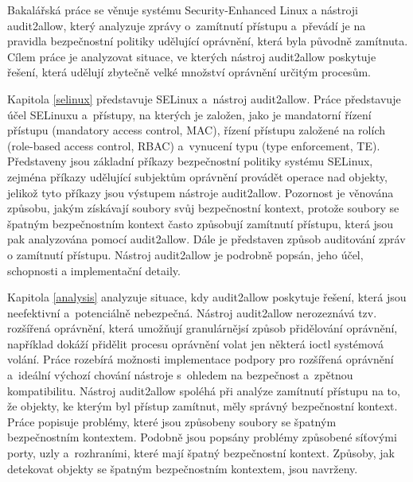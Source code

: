 Bakalářská práce se věnuje systému Security-Enhanced Linux a nástroji
audit2allow, který analyzuje zprávy o~zamítnutí přístupu a~převádí je na
pravidla bezpečnostní politiky udělující oprávnění, která byla původně
zamítnuta. Cílem práce je analyzovat situace, ve kterých nástroj audit2allow
poskytuje řešení, která udělují zbytečně velké množství oprávnění určitým
procesům.

Kapitola \ref{selinux} představuje SELinux a~nástroj audit2allow. Práce
představuje účel SELinuxu a~přístupy, na kterých je založen, jako je mandatorní
řízení přístupu (mandatory access control, MAC), řízení přístupu založené na
rolích (role-based access control, RBAC) a~vynucení typu (type enforcement, TE).
Představeny jsou základní příkazy bezpečnostní politiky systému SELinux, zejména
příkazy udělující subjektům oprávnění provádět operace nad objekty, jelikož tyto
příkazy jsou výstupem nástroje audit2allow. Pozornost je věnována způsobu, jakým
získávají soubory svůj bezpečnostní kontext, protože soubory se špatným
bezpečnostním kontext často způsobují zamítnutí přístupu, která jsou pak
analyzována pomocí audit2allow. Dále je představen způsob auditování zpráv o
zamítnutí přístupu. Nástroj audit2allow je podrobně popsán, jeho účel,
schopnosti a implementační detaily.

Kapitola \ref{analysis} analyzuje situace, kdy audit2allow poskytuje řešení,
která jsou neefektivní a~potenciálně nebezpečná. Nástroj audit2allow nerozeznává
tzv. rozšířená oprávnění, která umožňují granulárnějsí způsob přidělování
oprávnění, například dokáží přidělit procesu oprávnění volat jen některá ioctl
systémová volání. Práce rozebírá možnosti implementace podpory pro rozšířená
oprávnění a~ideální výchozí chování nástroje s~ohledem na bezpečnost a~zpětnou
kompatibilitu.
Nástroj audit2allow spoléhá při analýze zamítnutí přístupu na to, že
objekty, ke kterým byl přístup zamítnut, měly správný bezpečnostní kontext.
Práce popisuje problémy, které jsou způsobeny soubory se špatným bezpečnostním
kontextem. Podobně jsou popsány problémy způsobené síťovými porty, uzly
a~rozhraními, které mají špatný bezpečnostní kontext. Způsoby, jak detekovat
objekty se špatným bezpečnostním kontextem, jsou navrženy.

